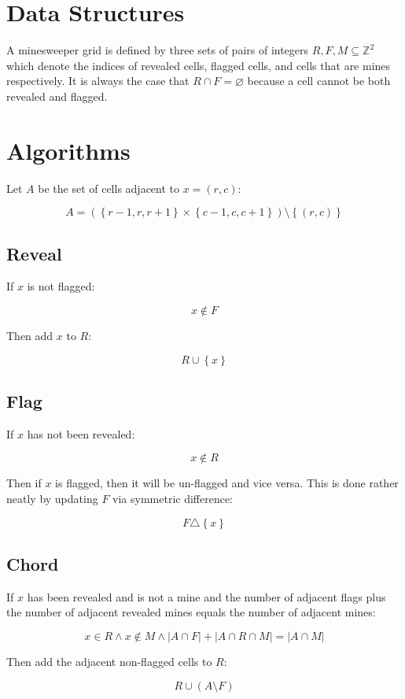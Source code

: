 \documentclass[12pt]{article}
\begin{document}
\maketitle
\tableofcontents

\section{Data Structures}

A minesweeper grid is defined by three sets of pairs of integers $R, F, M \subseteq \mathbb{Z} ^ 2$ which denote the indices of revealed cells, flagged cells, and cells that are mines respectively. It is always the case that $R \cap F = \varnothing$ because a cell cannot be both revealed and flagged.

\section{Algorithms}

Let $A$ be the set of cells adjacent to $x = (r, c)$:

$$A = \left ( \left \{ r - 1, r, r + 1 \right \} \times \left \{ c - 1, c, c + 1 \right \} \right ) \setminus \left \{ \left ( r, c \right ) \right \}$$

\subsection{Reveal}

If $x$ is not flagged:

$$x \notin F$$

Then add $x$ to $R$:

$$R \cup \left \{ x \right \}$$

\subsection{Flag}

If $x$ has not been revealed:

$$x \notin R$$

Then if $x$ is flagged, then it will be un-flagged and vice versa. This is done rather neatly by updating $F$ via symmetric difference:

$$F \triangle \left \{ x \right \}$$

\subsection{Chord}

If $x$ has been revealed and is not a mine and the number of adjacent flags plus the number of adjacent revealed mines equals the number of adjacent mines:

$$x \in R \wedge x \notin M \wedge \left | A \cap F \right | + \left | A \cap R \cap M \right | = \left | A \cap M \right |$$

Then add the adjacent non-flagged cells to $R$:

$$R \cup \left ( A \setminus F \right )$$
\end{document}
